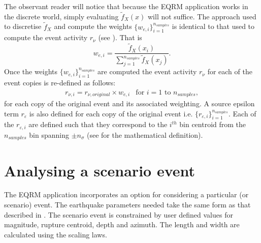 The observant reader will notice that because the EQRM application
works in the discrete world, simply evaluating $\tilde{f}_X(x)$
will not suffice. The approach used 
to discretise $\tilde{f}_X$ and compute the weights
$\{w_{e,i}\}_{i=1}^{n_{samples}}$ is identical to that used to
compute the event activity $r_\nu$ (see
). That is
\begin{equation}
w_{e,i} = \frac{\tilde{f}_X(x_i)}{\sum\limits_{j=1}^{n_{samples}}
\tilde{f}_X(x_j)}.
\end{equation}
Once the weights $\{w_{e,i}\}_{i=1}^{n_{samples}}$ are computed
the event activity $r_\nu$ for each of the event copies is
re-defined as follows:
\begin{equation}
\label{source:spawning-activity}
\begin{array}{ll}
r_{\nu,i} = r_{\nu,original} \times w_{e,i} & \textrm{for } i=1
\textrm{ to } n_{samples},
\end{array}
\end{equation}
for each copy of the original event and its associated weighting.
A source epsilon term $r_\varepsilon$ is also defined for each
copy of the original event i.e.
$\{r_{\varepsilon,i}\}_{i=1}^{n_{samples}}$. Each of the
$r_{\varepsilon,i}$ are defined such that they correspond to the
$i^{th}$ bin centroid from the $n_{samples}$ bin spanning $\pm
n_\sigma$ (see  for the mathematical
definition).


\section{Analysing a scenario event}
\label{sec:source-scenario} 
The EQRM application incorporates an option for considering
a particular (or scenario) event. The earthquake parameters needed take the same
form as that described in . The scenario
event is constrained by user defined values for magnitude, rupture centroid,
depth and azimuth. The length and width are calculated using the \citet{eqrm_Wells94} scaling laws.




